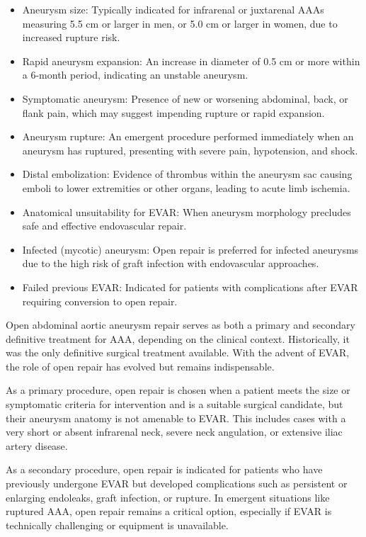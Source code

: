 \begin{itemize}
  \item Aneurysm size: Typically indicated for infrarenal or juxtarenal AAAs measuring 5.5 cm or larger in men, or 5.0 cm or larger in women, due to increased rupture risk.
  \item Rapid aneurysm expansion: An increase in diameter of 0.5 cm or more within a 6-month period, indicating an unstable aneurysm.
  \item Symptomatic aneurysm: Presence of new or worsening abdominal, back, or flank pain, which may suggest impending rupture or rapid expansion.
  \item Aneurysm rupture: An emergent procedure performed immediately when an aneurysm has ruptured, presenting with severe pain, hypotension, and shock.
  \item Distal embolization: Evidence of thrombus within the aneurysm sac causing emboli to lower extremities or other organs, leading to acute limb ischemia.
  \item Anatomical unsuitability for EVAR: When aneurysm morphology precludes safe and effective endovascular repair.
  \item Infected (mycotic) aneurysm: Open repair is preferred for infected aneurysms due to the high risk of graft infection with endovascular approaches.
  \item Failed previous EVAR: Indicated for patients with complications after EVAR requiring conversion to open repair.
\end{itemize}

Open abdominal aortic aneurysm repair serves as both a primary and secondary definitive treatment for AAA, depending on the clinical context. Historically, it was the only definitive surgical treatment available. With the advent of EVAR, the role of open repair has evolved but remains indispensable.

As a primary procedure, open repair is chosen when a patient meets the size or symptomatic criteria for intervention and is a suitable surgical candidate, but their aneurysm anatomy is not amenable to EVAR. This includes cases with a very short or absent infrarenal neck, severe neck angulation, or extensive iliac artery disease.

As a secondary procedure, open repair is indicated for patients who have previously undergone EVAR but developed complications such as persistent or enlarging endoleaks, graft infection, or rupture. In emergent situations like ruptured AAA, open repair remains a critical option, especially if EVAR is technically challenging or equipment is unavailable.

